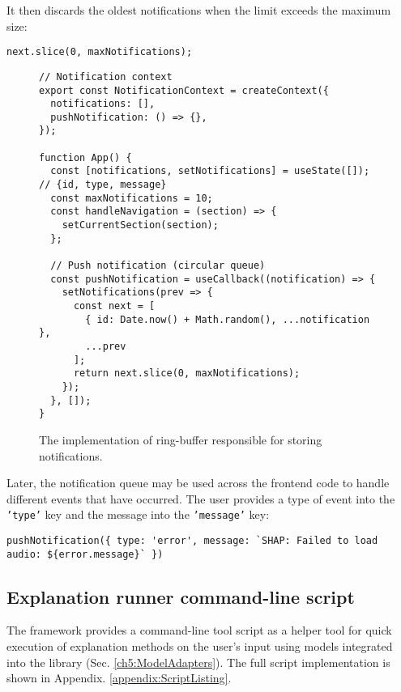 \documentclass[
    bindingoffset=5mm,  %
    footnoteindent=3mm, %
    hyphenation=true    %
]{src/wut-thesis}
\begin{document}
It then discards the oldest notifications when the limit exceeds the maximum size:
\begin{verbatim}
next.slice(0, maxNotifications);
\end{verbatim}

\begin{figure}%
\begin{verbatim}
// Notification context
export const NotificationContext = createContext({
  notifications: [],
  pushNotification: () => {},
});

function App() {
  const [notifications, setNotifications] = useState([]); // {id, type, message}
  const maxNotifications = 10;
  const handleNavigation = (section) => {
    setCurrentSection(section);
  };

  // Push notification (circular queue)
  const pushNotification = useCallback((notification) => {
    setNotifications(prev => {
      const next = [
        { id: Date.now() + Math.random(), ...notification },
        ...prev
      ];
      return next.slice(0, maxNotifications);
    });
  }, []);
}
\end{verbatim}
\caption{The implementation of ring-buffer responsible for storing notifications.}
\label{fig:NotificationImpl}
\end{figure}

Later, the notification queue may be used across the frontend code to handle different
events that have occurred. The user provides a type of event into the \texttt{'type'} key and
the message into the \texttt{'message'} key:
\begin{verbatim}
pushNotification({ type: 'error', message: `SHAP: Failed to load audio: ${error.message}` })
\end{verbatim}

\clearpage %
\subsection{Explanation runner command-line script}

The framework provides a command-line tool script as a helper tool for quick execution
of explanation methods on the user’s input using models integrated into the library
(Sec. \ref{ch5:ModelAdapters}). The full script implementation
is shown in Appendix. \ref{appendix:ScriptListing}.
\end{document}
